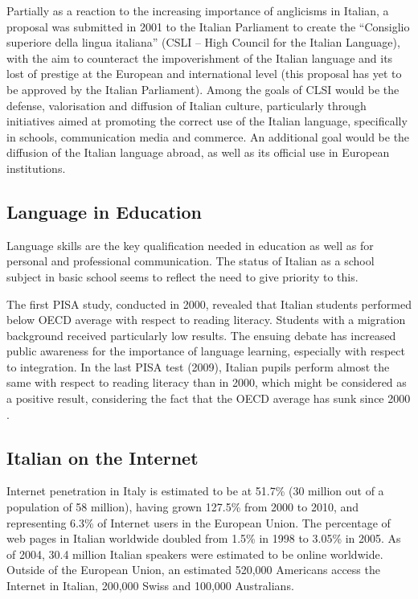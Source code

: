 \begin{multicols}{2}

Partially as a reaction to the increasing importance of anglicisms in Italian,
a proposal was submitted in 2001 to the Italian Parliament to create the
“Consiglio superiore della lingua italiana” (CSLI -- High Council for the
Italian Language), with the aim to counteract the impoverishment of the
Italian language and its lost of prestige at the European and international
level (this proposal has yet to be approved by the Italian Parliament). Among
the goals of CLSI would be the defense, valorisation and diffusion of Italian
culture, particularly through initiatives aimed at promoting the correct use
of the Italian language, specifically in schools, communication media and
commerce. An additional goal would be the diffusion of the Italian language
abroad, as well as its official use in European institutions.

\subsection{Language in Education}

Language skills are the key qualification needed in education as well as for
personal and professional communication. The status of Italian as a school
subject in basic school seems to reflect the need to give priority to this. 

The first PISA study, conducted in 2000, revealed that Italian
students performed below OECD average with respect to reading
literacy. Students with a migration background received particularly
low results. The ensuing debate has increased public awareness for the
importance of language learning, especially with respect to
integration. In the last PISA test (2009), Italian pupils perform
almost the same with respect to reading literacy than in 2000, which
might be considered as a positive result, considering the fact that
the OECD average has sunk since 2000 \cite{Pisa1}.



\subsection{Italian on the Internet}

Internet penetration in Italy is estimated to be at 51.7\% (30 million out of
a population of 58 million), having grown 127.5\% from 2000 to 2010, and
representing 6.3\% of Internet users in the European Union. The percentage of
web pages in Italian worldwide doubled from 1.5\% in 1998 to 3.05\% in
2005. As of 2004, 30.4 million Italian speakers were estimated to be online
worldwide. Outside of the European Union, an estimated 520,000 Americans
access the Internet in Italian, 200,000 Swiss and 100,000 Australians.


\end{multicols}

